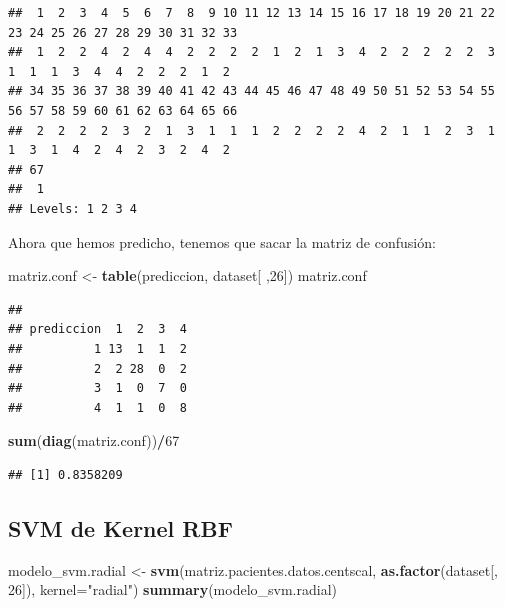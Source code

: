 \documentclass[]{article}
\newenvironment{Shaded}{\begin{snugshade}}{\end{snugshade}}
\newcommand{\KeywordTok}[1]{\textcolor[rgb]{0.13,0.29,0.53}{\textbf{#1}}}
\newcommand{\DataTypeTok}[1]{\textcolor[rgb]{0.13,0.29,0.53}{#1}}
\newcommand{\DecValTok}[1]{\textcolor[rgb]{0.00,0.00,0.81}{#1}}
\newcommand{\StringTok}[1]{\textcolor[rgb]{0.31,0.60,0.02}{#1}}
\newcommand{\OperatorTok}[1]{\textcolor[rgb]{0.81,0.36,0.00}{\textbf{#1}}}
\newcommand{\NormalTok}[1]{#1}
\begin{document}
\begin{verbatim}
##  1  2  3  4  5  6  7  8  9 10 11 12 13 14 15 16 17 18 19 20 21 22 23 24 25 26 27 28 29 30 31 32 33 
##  1  2  2  4  2  4  4  2  2  2  2  1  2  1  3  4  2  2  2  2  2  3  1  1  1  3  4  4  2  2  2  1  2 
## 34 35 36 37 38 39 40 41 42 43 44 45 46 47 48 49 50 51 52 53 54 55 56 57 58 59 60 61 62 63 64 65 66 
##  2  2  2  2  3  2  1  3  1  1  1  2  2  2  2  4  2  1  1  2  3  1  1  3  1  4  2  4  2  3  2  4  2 
## 67 
##  1 
## Levels: 1 2 3 4
\end{verbatim}

Ahora que hemos predicho, tenemos que sacar la matriz de confusión:

\begin{Shaded}
\begin{Highlighting}[]
\NormalTok{matriz.conf <-}\StringTok{ }\KeywordTok{table}\NormalTok{(prediccion, dataset[ ,}\DecValTok{26}\NormalTok{])}
\NormalTok{matriz.conf}
\end{Highlighting}
\end{Shaded}

\begin{verbatim}
##           
## prediccion  1  2  3  4
##          1 13  1  1  2
##          2  2 28  0  2
##          3  1  0  7  0
##          4  1  1  0  8
\end{verbatim}

\begin{Shaded}
\begin{Highlighting}[]
\KeywordTok{sum}\NormalTok{(}\KeywordTok{diag}\NormalTok{(matriz.conf))}\OperatorTok{/}\DecValTok{67}
\end{Highlighting}
\end{Shaded}

\begin{verbatim}
## [1] 0.8358209
\end{verbatim}

\subsection{SVM de Kernel RBF}\label{svm-de-kernel-rbf}

\begin{Shaded}
\begin{Highlighting}[]
\NormalTok{modelo_svm.radial <-}\StringTok{ }\KeywordTok{svm}\NormalTok{(matriz.pacientes.datos.centscal, }\KeywordTok{as.factor}\NormalTok{(dataset[, }\DecValTok{26}\NormalTok{]), }\DataTypeTok{kernel=}\StringTok{"radial"}\NormalTok{)}
\KeywordTok{summary}\NormalTok{(modelo_svm.radial)}
\end{Highlighting}
\end{Shaded}
\end{document}
